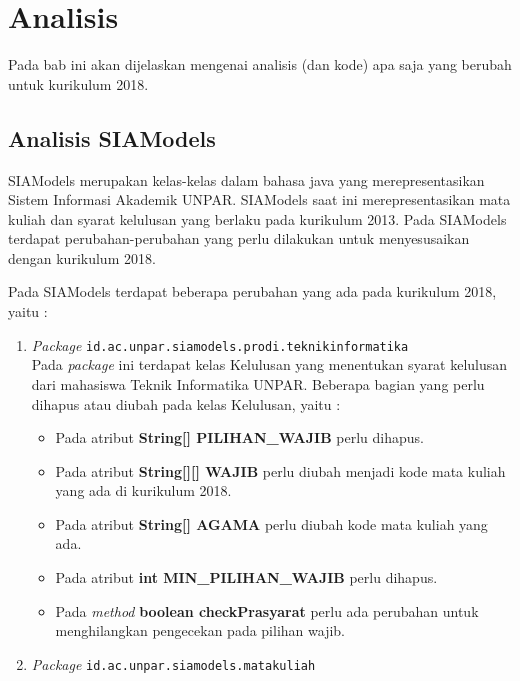\chapter{Analisis}
\label{chap:analisis}

Pada bab ini akan dijelaskan mengenai analisis (dan kode) apa saja yang berubah untuk kurikulum 2018.

\section{Analisis SIAModels }

SIAModels merupakan kelas-kelas dalam bahasa java yang merepresentasikan Sistem Informasi Akademik UNPAR. SIAModels saat ini merepresentasikan mata kuliah dan syarat kelulusan yang berlaku pada kurikulum 2013. Pada SIAModels terdapat perubahan-perubahan yang perlu dilakukan untuk menyesusaikan dengan kurikulum 2018.

Pada SIAModels terdapat beberapa perubahan yang ada pada kurikulum 2018, yaitu :
\begin{enumerate}
	\item \textit{Package} \texttt{id.ac.unpar.siamodels.prodi.teknikinformatika}\\
	Pada \textit{package} ini terdapat kelas Kelulusan yang menentukan syarat kelulusan dari mahasiswa Teknik Informatika UNPAR. Beberapa bagian yang perlu dihapus atau diubah pada kelas Kelulusan, yaitu :
	\begin{itemize}
		\item Pada atribut \textbf{String[] PILIHAN\_WAJIB} perlu dihapus.
		\item Pada atribut \textbf{String[][] WAJIB} perlu diubah menjadi kode mata kuliah yang ada di kurikulum 2018.
		\item Pada atribut \textbf{String[] AGAMA} perlu diubah kode mata kuliah yang ada.
		\item Pada atribut \textbf{int MIN\_PILIHAN\_WAJIB} perlu dihapus.
		\item Pada \textit{method} \textbf{boolean checkPrasyarat} perlu ada perubahan untuk menghilangkan pengecekan pada pilihan wajib.
	\end{itemize}
		
	\item \textit{Package} \texttt{id.ac.unpar.siamodels.matakuliah}
\end{enumerate}